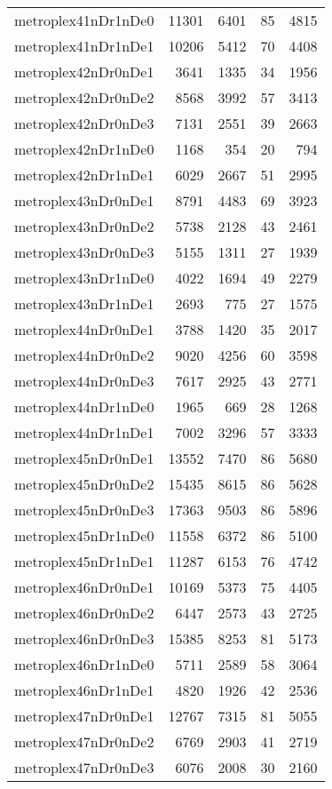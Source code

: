\begin{longtable}{lrrrr}
metroplex41nDr1nDe0 & 11301 & 6401 & 85 & 4815 \\
metroplex41nDr1nDe1 & 10206 & 5412 & 70 & 4408 \\
metroplex42nDr0nDe1 & 3641 & 1335 & 34 & 1956 \\
metroplex42nDr0nDe2 & 8568 & 3992 & 57 & 3413 \\
metroplex42nDr0nDe3 & 7131 & 2551 & 39 & 2663 \\
metroplex42nDr1nDe0 & 1168 & 354 & 20 & 794 \\
metroplex42nDr1nDe1 & 6029 & 2667 & 51 & 2995 \\
metroplex43nDr0nDe1 & 8791 & 4483 & 69 & 3923 \\
metroplex43nDr0nDe2 & 5738 & 2128 & 43 & 2461 \\
metroplex43nDr0nDe3 & 5155 & 1311 & 27 & 1939 \\
metroplex43nDr1nDe0 & 4022 & 1694 & 49 & 2279 \\
metroplex43nDr1nDe1 & 2693 & 775 & 27 & 1575 \\
metroplex44nDr0nDe1 & 3788 & 1420 & 35 & 2017 \\
metroplex44nDr0nDe2 & 9020 & 4256 & 60 & 3598 \\
metroplex44nDr0nDe3 & 7617 & 2925 & 43 & 2771 \\
metroplex44nDr1nDe0 & 1965 & 669 & 28 & 1268 \\
metroplex44nDr1nDe1 & 7002 & 3296 & 57 & 3333 \\
metroplex45nDr0nDe1 & 13552 & 7470 & 86 & 5680 \\
metroplex45nDr0nDe2 & 15435 & 8615 & 86 & 5628 \\
metroplex45nDr0nDe3 & 17363 & 9503 & 86 & 5896 \\
metroplex45nDr1nDe0 & 11558 & 6372 & 86 & 5100 \\
metroplex45nDr1nDe1 & 11287 & 6153 & 76 & 4742 \\
metroplex46nDr0nDe1 & 10169 & 5373 & 75 & 4405 \\
metroplex46nDr0nDe2 & 6447 & 2573 & 43 & 2725 \\
metroplex46nDr0nDe3 & 15385 & 8253 & 81 & 5173 \\
metroplex46nDr1nDe0 & 5711 & 2589 & 58 & 3064 \\
metroplex46nDr1nDe1 & 4820 & 1926 & 42 & 2536 \\
metroplex47nDr0nDe1 & 12767 & 7315 & 81 & 5055 \\
metroplex47nDr0nDe2 & 6769 & 2903 & 41 & 2719 \\
metroplex47nDr0nDe3 & 6076 & 2008 & 30 & 2160 \\

\end{longtable}
